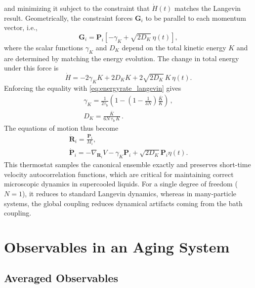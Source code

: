 and minimizing it subject to the constraint that $\dot{H}(t)$ matches the Langevin result. 
Geometrically, the constraint forces $\bm G_i$ to be parallel to each momentum vector, i.e., 
\begin{equation}
\bm{G}_i = \bm{P}_i \left[-\gamma_K + \sqrt{2D_K}\,\eta(t)\right],
\end{equation}
where the scalar functions $\gamma_K$ and $D_K$ depend on the total kinetic energy $K$ and are determined by matching the energy evolution. 
The change in total energy under this force is
\begin{equation}
\dot{H} = -2\gamma_K K + 2D_K K + 2\sqrt{2D_K}\,K\,\eta(t).
\end{equation}
Enforcing the equality with \cref{eq:energyrate_langevin} gives
\begin{gather}
\gamma_K = \frac{1}{2\tau_\mathrm{b}}\left(1-\left(1-\frac{1}{3N}\right)\frac{\bar{K}}{K}\right) \,, \\
D_K = \frac{\bar{K}}{6N\,\tau_\mathrm{b}\,K} \,.
\end{gather} 
The equations of motion thus become
\begin{gather}
\dot{\bm{R}}_i = \frac{\bm{P}_i}{M_i},  \\
\dot{\bm{P}}_i = -\nabla_{\bm{R}_i} V -\gamma_K \bm P_i + \sqrt{2 D_K} \bm P_i \eta(t). 
\end{gather}
This thermostat samples the canonical ensemble exactly and preserves short-time velocity autocorrelation functions, which are critical for maintaining correct microscopic dynamics in supercooled liquids.\cite{bussi2008stochastic} 
For a single degree of freedom ($N=1$), it reduces to standard Langevin dynamics, whereas in many-particle systems, the global coupling reduces dynamical artifacts coming from the bath coupling.


\section{Observables in an Aging System} \label{app:observables}


\subsection{Averaged Observables} \label{app:avgobserv}

